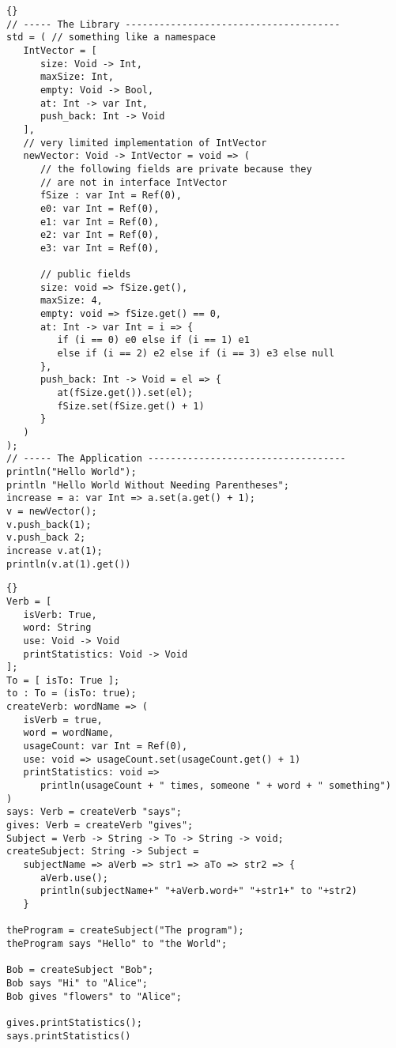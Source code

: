 \documentclass[12pt, draft]{article}
\begin{document}
\begin{lstlisting}[float,caption={A Code Example},captionpos=b]{}
// ----- The Library --------------------------------------
std = ( // something like a namespace
   IntVector = [
      size: Void -> Int,
      maxSize: Int,
      empty: Void -> Bool,
      at: Int -> var Int,
      push_back: Int -> Void
   ],   
   // very limited implementation of IntVector
   newVector: Void -> IntVector = void => (
      // the following fields are private because they
      // are not in interface IntVector
      fSize : var Int = Ref(0),
      e0: var Int = Ref(0),
      e1: var Int = Ref(0),
      e2: var Int = Ref(0),
      e3: var Int = Ref(0),
      
      // public fields
      size: void => fSize.get(),
      maxSize: 4,
      empty: void => fSize.get() == 0,
      at: Int -> var Int = i => {
         if (i == 0) e0 else if (i == 1) e1 
         else if (i == 2) e2 else if (i == 3) e3 else null
      },
      push_back: Int -> Void = el => {
         at(fSize.get()).set(el);
         fSize.set(fSize.get() + 1)
      }
   )      
);
// ----- The Application -----------------------------------
println("Hello World");
println "Hello World Without Needing Parentheses";
increase = a: var Int => a.set(a.get() + 1);
v = newVector();
v.push_back(1);
v.push_back 2;
increase v.at(1);
println(v.at(1).get())
\end{lstlisting}



\begin{lstlisting}[float,caption={Domain Specific Language Example},captionpos=b]{}
Verb = [
   isVerb: True,
   word: String
   use: Void -> Void
   printStatistics: Void -> Void
];
To = [ isTo: True ];
to : To = (isTo: true);
createVerb: wordName => (
   isVerb = true,
   word = wordName,
   usageCount: var Int = Ref(0),
   use: void => usageCount.set(usageCount.get() + 1)
   printStatistics: void => 
      println(usageCount + " times, someone " + word + " something")
)
says: Verb = createVerb "says";
gives: Verb = createVerb "gives";
Subject = Verb -> String -> To -> String -> void;
createSubject: String -> Subject = 
   subjectName => aVerb => str1 => aTo => str2 => {
      aVerb.use();
      println(subjectName+" "+aVerb.word+" "+str1+" to "+str2)
   }

theProgram = createSubject("The program");
theProgram says "Hello" to "the World";

Bob = createSubject "Bob";
Bob says "Hi" to "Alice";
Bob gives "flowers" to "Alice";

gives.printStatistics();
says.printStatistics()
\end{lstlisting}
\end{document}
